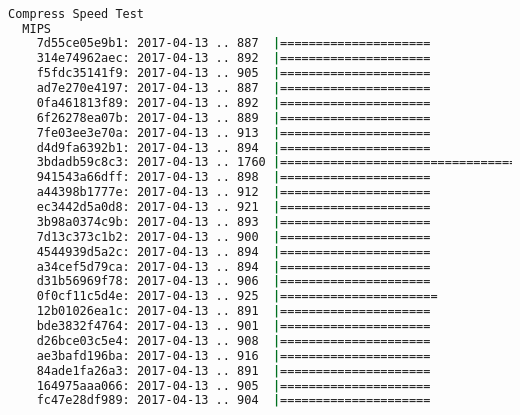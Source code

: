 \documentclass[french]{article}
\begin{document}
\begin{lstlisting}[language=bash,caption={7-Zip Compression 9.20.1}]

Compress Speed Test
  MIPS
    7d55ce05e9b1: 2017-04-13 .. 887  |=====================
    314e74962aec: 2017-04-13 .. 892  |=====================
    f5fdc35141f9: 2017-04-13 .. 905  |=====================
    ad7e270e4197: 2017-04-13 .. 887  |=====================
    0fa461813f89: 2017-04-13 .. 892  |=====================
    6f26278ea07b: 2017-04-13 .. 889  |=====================
    7fe03ee3e70a: 2017-04-13 .. 913  |=====================
    d4d9fa6392b1: 2017-04-13 .. 894  |=====================
    3bdadb59c8c3: 2017-04-13 .. 1760 |=========================================
    941543a66dff: 2017-04-13 .. 898  |=====================
    a44398b1777e: 2017-04-13 .. 912  |=====================
    ec3442d5a0d8: 2017-04-13 .. 921  |=====================
    3b98a0374c9b: 2017-04-13 .. 893  |=====================
    7d13c373c1b2: 2017-04-13 .. 900  |=====================
    4544939d5a2c: 2017-04-13 .. 894  |=====================
    a34cef5d79ca: 2017-04-13 .. 894  |=====================
    d31b56969f78: 2017-04-13 .. 906  |=====================
    0f0cf11c5d4e: 2017-04-13 .. 925  |======================
    12b01026ea1c: 2017-04-13 .. 891  |=====================
    bde3832f4764: 2017-04-13 .. 901  |=====================
    d26bce03c5e4: 2017-04-13 .. 908  |=====================
    ae3bafd196ba: 2017-04-13 .. 916  |=====================
    84ade1fa26a3: 2017-04-13 .. 891  |=====================
    164975aaa066: 2017-04-13 .. 905  |=====================
    fc47e28df989: 2017-04-13 .. 904  |=====================
\end{lstlisting}
\newpage
\end{document}
